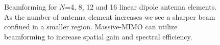 \begin{figure}[!h]
\centering
  \hspace{1mm}
  \hspace{1mm}
  \hspace{1mm}
  \hspace{1mm}
  \caption{Beamforming for $N$=4, 8, 12 and 16 linear dipole antenna elements. As the number of antenna element increases we see a sharper beam confined in a smaller region. Massive-MIMO can utilize beamforming to increase spatial gain and spectral efficiency.} 
\label{beamforming}      
\end{figure}

